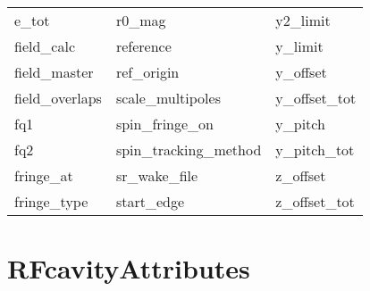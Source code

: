 \begin{tabular}{lll}
e_tot                       & r0_mag                      & y2_limit                    \\
field_calc                  & reference                   & y_limit                     \\
field_master                & ref_origin                  & y_offset                    \\
field_overlaps              & scale_multipoles            & y_offset_tot                \\
fq1                         & spin_fringe_on              & y_pitch                     \\
fq2                         & spin_tracking_method        & y_pitch_tot                 \\
fringe_at                   & sr_wake_file                & z_offset                    \\
fringe_type                 & start_edge                  & z_offset_tot                \\
 \bottomrule
 \end{tabular}
 \vfill
 
 \section{RFcavityAttributes}
 \label{s:list.rfcavity}
 
